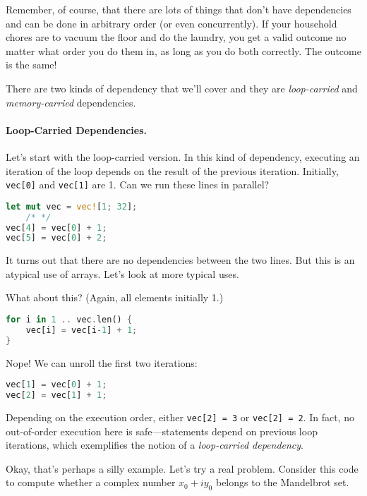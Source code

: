 Remember, of course, that there are lots of things that don't have dependencies and can be done in arbitrary order (or even concurrently). If your household chores are to vacuum the floor and do the laundry, you get a valid outcome no matter what order you do them in, as long as you do both correctly. The outcome is the same!

There are two kinds of dependency that we'll cover and they are \emph{loop-carried} and \emph{memory-carried} dependencies.

\paragraph{Loop-Carried Dependencies.} Let's start with the loop-carried version. In this kind of dependency, executing an iteration of the loop depends on the result of the previous iteration. Initially, {\tt vec[0]} and {\tt vec[1]} are 1. Can we run these lines in parallel?

\begin{lstlisting}[language=Rust]
let mut vec = vec![1; 32];
    /* */
vec[4] = vec[0] + 1;
vec[5] = vec[0] + 2;
\end{lstlisting}


It turns out that there are no dependencies between the two lines. But this is
an atypical use of arrays. Let's look at more typical uses.

What about this? (Again, all elements initially 1.)

\begin{lstlisting}[language=Rust]
for i in 1 .. vec.len() {
    vec[i] = vec[i-1] + 1;
}
\end{lstlisting}

Nope! We can unroll the first two iterations:
\begin{lstlisting}[language=Rust]
vec[1] = vec[0] + 1;
vec[2] = vec[1] + 1;
\end{lstlisting}

Depending on the execution order, either {\tt vec[2] = 3} or {\tt vec[2] =
  2}.  In fact, no out-of-order execution here is safe---statements depend
on previous loop iterations, which exemplifies the notion of a
\emph{loop-carried dependency}. 

Okay, that's perhaps a silly example. 
Let's try a real problem. Consider this code to compute whether a complex number $x_0 + iy_0$ belongs to the Mandelbrot set.

